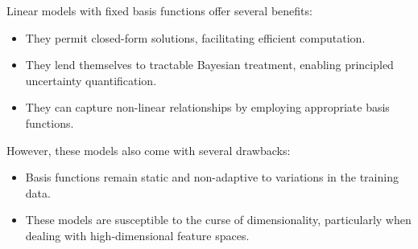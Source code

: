 Linear models with fixed basis functions offer several benefits:
\begin{itemize}
    \item They permit closed-form solutions, facilitating efficient computation.
    \item They lend themselves to tractable Bayesian treatment, enabling principled uncertainty quantification.
    \item They can capture non-linear relationships by employing appropriate basis functions.
\end{itemize}
However, these models also come with several drawbacks:
\begin{itemize}
    \item Basis functions remain static and non-adaptive to variations in the training data.
    \item These models are susceptible to the curse of dimensionality, particularly when dealing with high-dimensional feature spaces.
\end{itemize}